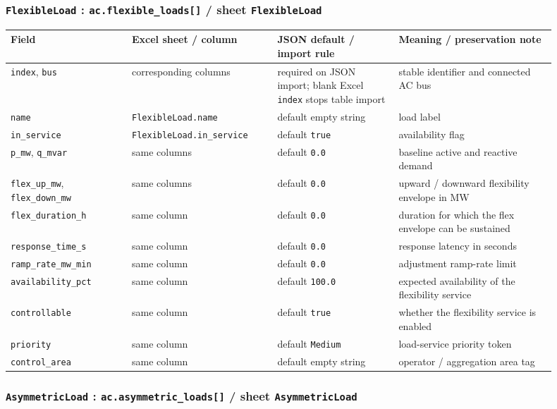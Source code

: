\subsubsection*{\texttt{FlexibleLoad} : \texttt{ac.flexible\_loads[]} / sheet \texttt{FlexibleLoad}}

\begin{longtable}{L{0.20\linewidth}L{0.24\linewidth}L{0.20\linewidth}L{0.26\linewidth}}
\toprule
Field & Excel sheet / column & JSON default / import rule & Meaning / preservation note \\
\midrule
\endhead
\texttt{index}, \texttt{bus} & corresponding columns & required on JSON import; blank Excel \texttt{index} stops table import & stable identifier and connected AC bus \\
\texttt{name} & \texttt{FlexibleLoad.name} & default empty string & load label \\
\texttt{in\_service} & \texttt{FlexibleLoad.in\_service} & default \texttt{true} & availability flag \\
\texttt{p\_mw}, \texttt{q\_mvar} & same columns & default \texttt{0.0} & baseline active and reactive demand \\
\texttt{flex\_up\_mw}, \texttt{flex\_down\_mw} & same columns & default \texttt{0.0} & upward / downward flexibility envelope in MW \\
\texttt{flex\_duration\_h} & same column & default \texttt{0.0} & duration for which the flex envelope can be sustained \\
\texttt{response\_time\_s} & same column & default \texttt{0.0} & response latency in seconds \\
\texttt{ramp\_rate\_mw\_min} & same column & default \texttt{0.0} & adjustment ramp-rate limit \\
\texttt{availability\_pct} & same column & default \texttt{100.0} & expected availability of the flexibility service \\
\texttt{controllable} & same column & default \texttt{true} & whether the flexibility service is enabled \\
\texttt{priority} & same column & default \texttt{Medium} & load-service priority token \\
\texttt{control\_area} & same column & default empty string & operator / aggregation area tag \\
\bottomrule
\end{longtable}

\subsubsection*{\texttt{AsymmetricLoad} : \texttt{ac.asymmetric\_loads[]} / sheet \texttt{AsymmetricLoad}}

